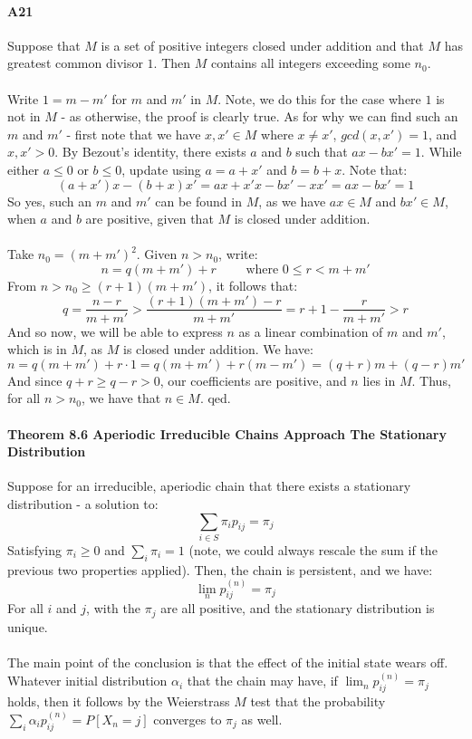\documentclass[12pt,a4paper]{article}
\newcommand{\1}[1]{\mathbbm{1}\left\{ #1 \right\}}
\begin{document}
\paragraph{A21} Suppose that $M$ is a set of positive integers closed under addition and that $M$ has greatest common divisor $1$. Then $M$ contains all integers exceeding some $n_0$.
\\\\
Write $1 = m - m'$ for $m$ and $m'$ in $M$. Note, we do this for the case where $1$ is not in $M$ - as otherwise, the proof is clearly true. As for why we can find such an $m$ and $m'$ - first note that we have $x,x' \in M$ where $x \neq x'$, $gcd(x,x') = 1$, and $x,x' > 0$. By Bezout's identity, there exists $a$ and $b$ such that $ax - bx' = 1$. While either $a \leq 0$ or $b \leq 0$, update using $a = a + x'$ and $b = b + x$. Note that:
$$
	(a + x')x - (b + x)x' = ax + x'x - bx' - xx' = ax - bx' = 1
$$
So yes, such an $m$ and $m'$ can be found in $M$, as we have $ax \in M$ and $bx' \in M$, when $a$ and $b$ are positive, given that $M$ is closed under addition.
\\\\
Take $n_0 = (m + m')^2$. Given $n > n_0$, write:
$$
	n = q(m + m') + r \quad\quad\text{ where } 0 \leq r < m + m'
$$
From $n > n_0 \geq (r + 1)(m + m')$, it follows that:
$$
	q = \frac{n - r}{m + m'} > \frac{(r + 1)(m + m') - r}{m + m'} =
	r + 1 - \frac{r}{m + m'} > r
$$
And so now, we will be able to express $n$ as a linear combination of $m$ and $m'$, which is in $M$, as $M$ is closed under addition. We have:
$$
	n = q(m + m') + r \cdot 1 =
	q(m + m') + r(m - m') = (q + r)m + (q-r)m'
$$
And since $q + r \geq q - r > 0$, our coefficients are positive, and $n$ lies in $M$. Thus, for all $n > n_0$, we have that $n \in M$. qed.

\paragraph{Theorem 8.6 Aperiodic Irreducible Chains Approach The Stationary Distribution} Suppose for an irreducible, aperiodic chain that there exists a stationary distribution - a solution to:
$$
	\sum_{i \in S} \pi_i p_{ij} = \pi_j
$$
Satisfying $\pi_i \geq 0$ and $\sum_i \pi_i = 1$ (note, we could always rescale the sum if the previous two properties applied). Then, the chain is persistent, and we have:
$$
	\lim_n p_{ij}^{(n)} = \pi_j
$$
For all $i$ and $j$, with the $\pi_j$ are all positive, and the stationary distribution is unique.
\\\\
The main point of the conclusion is that the effect of the initial state wears off. Whatever initial distribution $\alpha_i$ that the chain may have, if $\lim_n p_{ij}^{(n)} = \pi_j$ holds, then it follows by the Weierstrass $M$ test that the probability $\sum_i \alpha_i p_{ij}^{(n)} = P[X_n = j]$ converges to $\pi_j$ as well.
\end{document}
